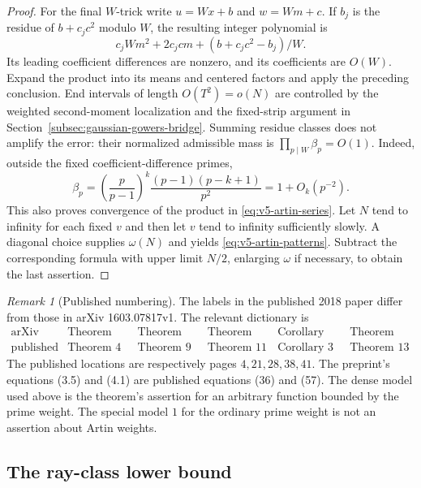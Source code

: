 \documentclass[11pt]{article}
\theoremstyle{definition}
\theoremstyle{remark}
\newtheorem{remark}[theorem]{Remark}
\begin{document}
\begin{proof}
For the final $W$-trick write $u=Wx+b$ and $w=Wm+c$.
If $b_j$ is the residue of $b+c_jc^2$ modulo $W$, the resulting integer
polynomial is
\[
 c_jWm^2+2c_jcm+(b+c_jc^2-b_j)/W.
\]
Its leading coefficient differences are nonzero, and its coefficients
are $O(W)$. Expand the product into its means and centered factors and
apply the preceding conclusion. End intervals of length $O(T^2)=o(N)$
are controlled by the weighted second-moment localization and the
fixed-strip argument in Section~\ref{subsec:gaussian-gowers-bridge}. Summing residue classes does not
amplify the error: their normalized admissible mass is
$\prod_{p\mid W}\beta_p=O(1)$.
Indeed, outside the fixed coefficient-difference primes,
\[
 \beta_p=\left(\frac p{p-1}\right)^k
                \frac{(p-1)(p-k+1)}{p^2}=1+O_k(p^{-2}).
\]
This also proves convergence of the product in
\eqref{eq:v5-artin-series}.
Let $N$ tend to infinity for each fixed $v$ and then let $v$ tend to
infinity sufficiently slowly. A diagonal choice supplies $\omega(N)$
and yields \eqref{eq:v5-artin-patterns}. Subtract the corresponding
formula with upper limit $N/2$, enlarging $\omega$ if necessary, to
obtain the last assertion.
\end{proof}

\begin{remark}[Published numbering]\label{rem:v5-tz-numbering}
The labels in the published 2018 paper differ from those in arXiv
1603.07817v1. The relevant dictionary is
\[
\begin{array}{c|ccccc}
 \text{arXiv} &\text{Theorem 1.4}&\text{Theorem 2.5}&\text{Theorem 3.1}
               &\text{Corollary 3.9}&\text{Theorem 4.1}\\
 \text{published}&\text{Theorem 4}&\text{Theorem 9}&\text{Theorem 11}
               &\text{Corollary 3}&\text{Theorem 13}
\end{array}
\]
The published locations are respectively pages $4,21,28,38,41$.
The preprint's equations (3.5) and (4.1) are published equations (36)
and (57). The dense model used above is the theorem's assertion for an
arbitrary function bounded by the prime weight. The special model $1$
for the ordinary prime weight is not an assertion about Artin weights.
\end{remark}

\subsection{The ray-class lower bound}\label{subsec:v5-ray-density}
\end{document}
